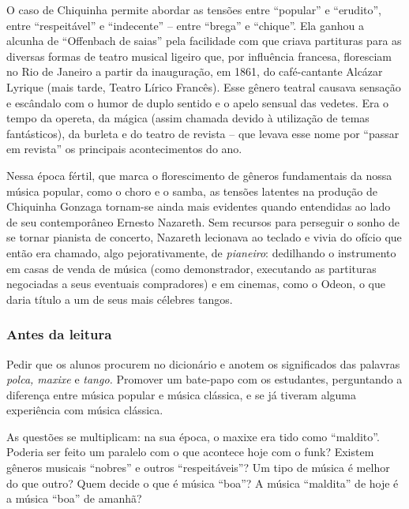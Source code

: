 \documentclass[11pt]{extarticle}
\begin{document}
O caso de Chiquinha permite abordar as tensões entre ``popular'' e
``erudito'', entre ``respeitável'' e ``indecente'' -- entre ``brega'' e
``chique''. Ela ganhou a alcunha de ``Offenbach de saias'' pela
facilidade com que criava partituras para as diversas formas de teatro
musical ligeiro que, por influência francesa, floresciam no Rio de
Janeiro a partir da inauguração, em 1861, do café-cantante Alcázar
Lyrique (mais tarde, Teatro Lírico Francês). Esse gênero teatral causava
sensação e escândalo com o humor de duplo sentido e o apelo sensual das
vedetes. Era o tempo da opereta, da mágica (assim chamada devido à
utilização de temas fantásticos), da burleta e do teatro de revista --
que levava esse nome por ``passar em revista'' os principais
acontecimentos do ano.

Nessa época fértil, que marca o florescimento de gêneros fundamentais da
nossa música popular, como o choro e o samba, as tensões latentes na
produção de Chiquinha Gonzaga tornam-se ainda mais evidentes quando
entendidas ao lado de seu contemporâneo Ernesto Nazareth. Sem recursos
para perseguir o sonho de se tornar pianista de concerto, Nazareth
lecionava ao teclado e vivia do ofício que então era chamado, algo
pejorativamente, de \emph{pianeiro}: dedilhando o instrumento em casas
de venda de música (como demonstrador, executando as partituras
negociadas a seus eventuais compradores) e em cinemas, como o Odeon, o
que daria título a um de seus mais célebres tangos.



\subsubsection{Antes da leitura}

Pedir que os alunos procurem no dicionário e anotem os significados das
palavras \emph{polca, maxixe} e \emph{tango.} Promover um bate-papo com
os estudantes, perguntando a diferença entre música popular e música
clássica, e se já tiveram alguma experiência com música clássica.

As questões se multiplicam: na sua época, o maxixe era tido como
``maldito''. Poderia ser feito um paralelo com o que acontece hoje com o
funk? Existem gêneros musicais ``nobres'' e outros ``respeitáveis''? Um
tipo de música é melhor do que outro? Quem decide o que é música
``boa''? A música ``maldita'' de hoje é a música ``boa'' de amanhã?
\end{document}
